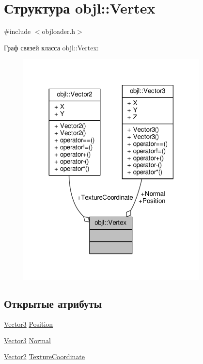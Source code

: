 \hypertarget{structobjl_1_1_vertex}{}\section{Структура objl\+:\+:Vertex}
\label{structobjl_1_1_vertex}


{\ttfamily \#include $<$objloader.\+h$>$}



Граф связей класса objl\+:\+:Vertex\+:
\nopagebreak
\begin{figure}[H]
\begin{center}
\leavevmode
\includegraphics[width=272pt]{db/d1b/structobjl_1_1_vertex__coll__graph}
\end{center}
\end{figure}
\subsection*{Открытые атрибуты}
\begin{DoxyCompactItemize}
\item 
\hyperlink{structobjl_1_1_vector3}{Vector3} \hyperlink{structobjl_1_1_vertex_a08acd50ed3a3a8b7b0b6ca0b78b61c13}{Position}
\item 
\hyperlink{structobjl_1_1_vector3}{Vector3} \hyperlink{structobjl_1_1_vertex_a0a5918e142a939241edeec52944b9edf}{Normal}
\item 
\hyperlink{structobjl_1_1_vector2}{Vector2} \hyperlink{structobjl_1_1_vertex_af05b2c1ef5f35a15c8ada3e2cd99a9b1}{Texture\+Coordinate}
\end{DoxyCompactItemize}


